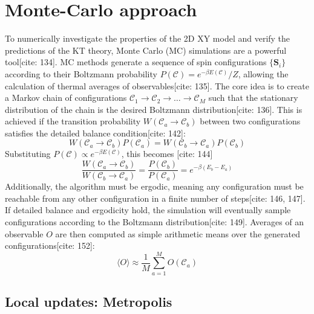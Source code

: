 \documentclass[11pt]{article}
\begin{document}
\section{Monte-Carlo approach}

To numerically investigate the properties of the 2D XY model and verify the predictions of the KT theory, Monte Carlo (MC) simulations are a powerful tool[cite: 134]. MC methods generate a sequence of spin configurations $\{\mathbf{S}_i\}$ according to their Boltzmann probability $P(\mathcal{C}) = e^{-\beta E(\mathcal{C})} / Z$, allowing the calculation of thermal averages of observables[cite: 135].
The core idea is to create a Markov chain of configurations $\mathcal{C}_1 \to \mathcal{C}_2 \to \dots \to \mathcal{C}_M$ such that the stationary distribution of the chain is the desired Boltzmann distribution[cite: 136]. This is achieved if the transition probability $W(\mathcal{C}_a \to \mathcal{C}_b)$ between two configurations satisfies the detailed balance condition[cite: 142]:
\begin{equation}
W(\mathcal{C}_a \to \mathcal{C}_b) P(\mathcal{C}_a) = W(\mathcal{C}_b \to \mathcal{C}_a) P(\mathcal{C}_b) \label{eq:detailed_balance}
\end{equation}
Substituting $P(\mathcal{C}) \propto e^{-\beta E(\mathcal{C})}$, this becomes [cite: 144]
\begin{equation}
\frac{W(\mathcal{C}_a \to \mathcal{C}_b)}{W(\mathcal{C}_b \to \mathcal{C}_a)} = \frac{P(\mathcal{C}_b)}{P(\mathcal{C}_a)} = e^{-\beta (E_b - E_a)} \label{eq:db_ratio}
\end{equation}
Additionally, the algorithm must be ergodic, meaning any configuration must be reachable from any other configuration in a finite number of steps[cite: 146, 147]. If detailed balance and ergodicity hold, the simulation will eventually sample configurations according to the Boltzmann distribution[cite: 149]. Averages of an observable $O$ are then computed as simple arithmetic means over the generated configurations[cite: 152]:
\begin{equation}
\langle O \rangle \approx \frac{1}{M} \sum_{a=1}^M O(\mathcal{C}_a) \label{eq:mc_average}
\end{equation}

\subsection{Local updates: Metropolis}
\end{document}
